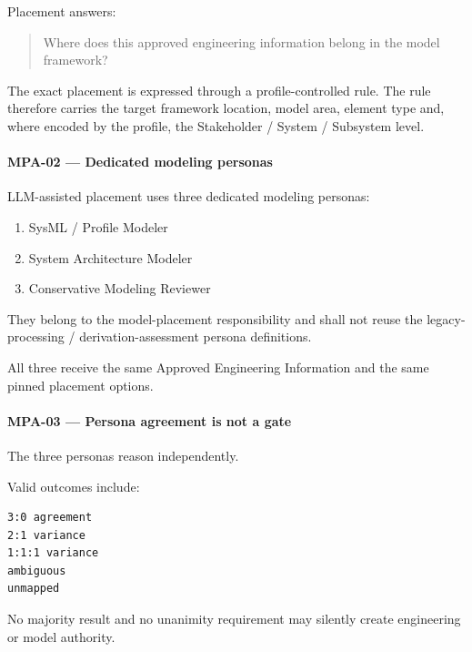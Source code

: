 Placement answers:

\begin{quote}
Where does this approved engineering information belong in the model framework?
\end{quote}

The exact placement is expressed through a profile-controlled rule. The rule therefore carries the target framework location, model area, element type and, where encoded by the profile, the Stakeholder / System / Subsystem level.

\hypertarget{mpa-02--dedicated-modeling-personas}{%
\paragraph{MPA-02 --- Dedicated modeling personas}\label{mpa-02--dedicated-modeling-personas}}

LLM-assisted placement uses three dedicated modeling personas:

\begin{enumerate}
\def\labelenumi{\arabic{enumi}.}
\tightlist
\item
  SysML / Profile Modeler
\item
  System Architecture Modeler
\item
  Conservative Modeling Reviewer
\end{enumerate}

They belong to the model-placement responsibility and shall not reuse the legacy-processing / derivation-assessment persona definitions.

All three receive the same Approved Engineering Information and the same pinned placement options.

\hypertarget{mpa-03--persona-agreement-is-not-a-gate}{%
\paragraph{MPA-03 --- Persona agreement is not a gate}\label{mpa-03--persona-agreement-is-not-a-gate}}

The three personas reason independently.

Valid outcomes include:

\begin{verbatim}
3:0 agreement
2:1 variance
1:1:1 variance
ambiguous
unmapped
\end{verbatim}

No majority result and no unanimity requirement may silently create engineering or model authority.

